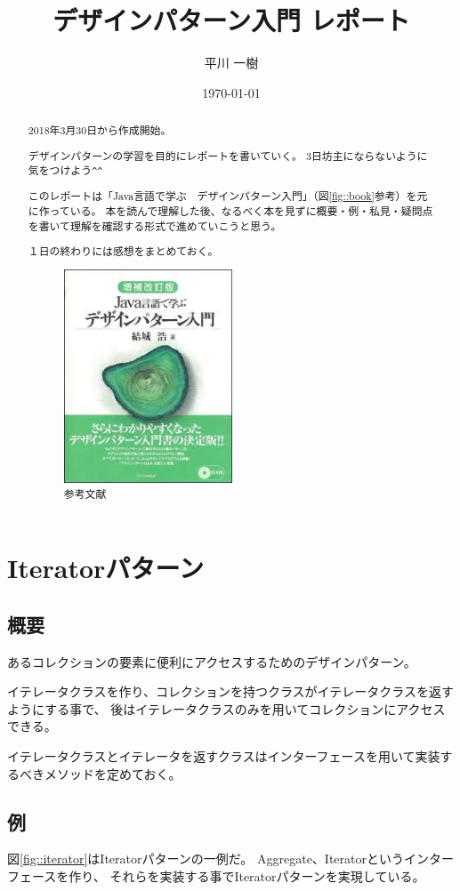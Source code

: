 \documentclass[11pt]{jsarticle}
\title{デザインパターン入門 レポート}
\author{平川 一樹}
\date{\today}
\begin{document}
	\maketitle
	
	\begin{abstract}
		2018年3月30日から作成開始。
		
		デザインパターンの学習を目的にレポートを書いていく。
		3日坊主にならないように気をつけよう\verb|^^|
		
		このレポートは「Java言語で学ぶ　デザインパターン入門」（図\ref{fig::book}参考）を元に作っている。
		本を読んで理解した後、なるべく本を見ずに概要・例・私見・疑問点を書いて理解を確認する形式で進めていこうと思う。
		
		１日の終わりには感想をまとめておく。
		\begin{figure}[htbp]
			\centering
			\includegraphics[width = 5cm, bb = 0 0 199 253]{book.jpg}
			\caption{参考文献}\label{fig::book}
		\end{figure}
	\end{abstract}
	
	\section{Iteratorパターン}
	\subsection{概要}
		あるコレクションの要素に便利にアクセスするためのデザインパターン。
		
		イテレータクラスを作り、コレクションを持つクラスがイテレータクラスを返すようにする事で、
		後はイテレータクラスのみを用いてコレクションにアクセスできる。
		
		イテレータクラスとイテレータを返すクラスはインターフェースを用いて実装するべきメソッドを定めておく。
	\subsection{例}
		図\ref{fig::iterator}はIteratorパターンの一例だ。
		Aggregate、Iteratorというインターフェースを作り、
		それらを実装する事でIteratorパターンを実現している。
		
\end{document}
